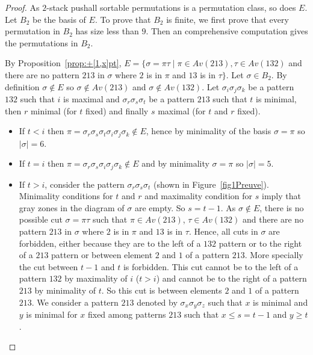 \documentclass[11pt]{article}
\newcommand{\pushall}{$2$-stack pushall sortable\xspace}
\begin{document}
\begin{proof}
As \pushall permutations is a permutation class, so does $E$. 
Let $B_2$ be the basis of $E$. 
To prove that $B_2$ is finite, we first prove that every permutation in $B_2$ has size less than $9$. 
Then an comprehensive computation gives the permutations in $B_2$.

By Proposition~\ref{prop:+[1,x]pt}, $E = \{ \sigma = \pi \tau \mid \pi \in Av(213), \tau \in Av(132)$ and there are no pattern $213$ in $\sigma$ where $2$ is in $\pi$ and $13$ is in $\tau \}$. 
Let $\sigma \in B_2$. 
By definition $\sigma \not\in E$ so $\sigma \not\in Av(213)$ and $\sigma \not\in Av(132)$. 
Let $\sigma_i \sigma_j \sigma_k$ be a pattern $132$ such that $i$ is maximal and $\sigma_r \sigma_s \sigma_t$ be a pattern $213$ such that $t$ is minimal, then $r$ minimal (for $t$ fixed) and finally $s$ maximal (for $t$ and $r$ fixed).
\begin{itemize}
\item If $t < i$ then $\pi = \sigma_r \sigma_s \sigma_t \sigma_i \sigma_j \sigma_k \notin E$, hence by minimality of the basis $\sigma = \pi$ so $|\sigma| = 6$.
\item If $t = i$ then $\pi = \sigma_r \sigma_s \sigma_i \sigma_j \sigma_k \notin E$ and by minimality $\sigma = \pi$ so $|\sigma| = 5$.
\item If $t > i$, consider the pattern $\sigma_r \sigma_s \sigma_t$ (shown in Figure~\ref{fig1Preuve}). 
Minimality conditions for $t$ and $r$ and maximality condition for $s$ imply that gray zones in the diagram of $\sigma$ are empty. 
So $s = t-1$. 
As $\sigma \notin E$, there is no possible cut $\sigma = \pi \tau$ such that $\pi \in Av(213)$, $\tau \in Av(132)$ and there are no pattern $213$ in $\sigma$ where $2$ is in $\pi$ and $13$ is in $\tau$. 
Hence, all cuts in $\sigma$ are forbidden, either because they are to the left of a $132$ pattern or to the right of a $213$ pattern or between element $2$ and $1$ of a pattern $213$. 
More specially the cut between $t-1$ and $t$ is forbidden. 
This cut cannot be to the left of a pattern $132$ by maximality of $i$ ($t > i$) and cannot be to the right of a pattern $213$ by minimality of $t$. 
So this cut is between elements $2$ and $1$ of a pattern $213$. 
We consider a pattern $213$ denoted by $\sigma_x \sigma_y \sigma_z$ such that $x$ is minimal and $y$ is minimal for $x$ fixed among patterns $213$ such that $x \leq s = t-1$ and $y \geq t$.


\end{itemize}
\end{proof}
\end{document}
